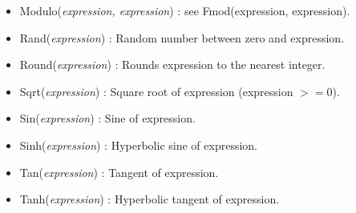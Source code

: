 \documentclass[dvipdfmx, 9pt, a4paper]{article}
\numberwithin{equation}{section}
\begin{document}
\begin{itemize}
\item Modulo({\it expression, expression}) : see Fmod(expression, expression).
\item Rand({\it expression}) : Random number between zero and expression.
\item Round({\it expression}) : Rounds expression to the nearest integer.
\item Sqrt({\it expression}) : Square root of expression (expression $>= 0$).
\item Sin({\it expression}) : Sine of expression.
\item Sinh({\it expression}) : Hyperbolic sine of expression.
\item Tan({\it expression}) : Tangent of expression.
\item Tanh({\it expression}) : Hyperbolic tangent of expression.
\end{itemize}
\end{document}
